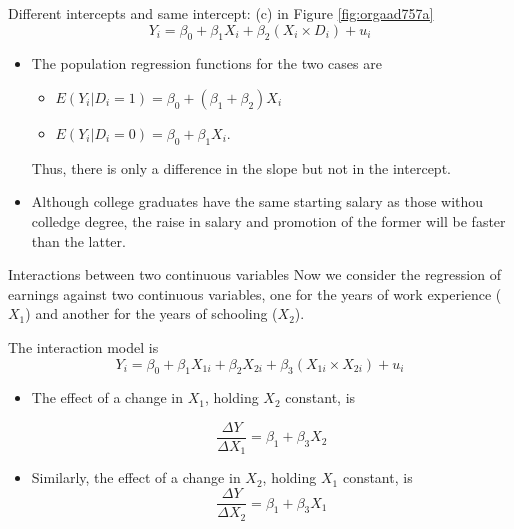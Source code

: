 \documentclass[presentation,10pt]{beamer}
\begin{document}
\begin{frame}[label={sec:org9cf1937}]{Different intercepts and same intercept: (c) in Figure \ref{fig:orgaad757a}}
\begin{equation}
\label{eq:interact-dx-c}
Y_i = \beta_0 + \beta_1 X_i + \beta_2 (X_i \times D_i) + u_i
\end{equation}

\begin{itemize}
\item The population regression functions for the two cases are
\begin{itemize}
\item \(E(Y_i|D_i=1) = \beta_0 + (\beta_1 + \beta_2) X_i\)
\item \(E(Y_i|D_i=0) = \beta_0 + \beta_1 X_i\).
\end{itemize}
Thus, there is only a difference in the slope but not in the
intercept.

\item Although college graduates have the same starting salary as those
withou colledge degree, the raise in salary and promotion of the
former will be faster than the latter.
\end{itemize}
\end{frame}

\begin{frame}[label={sec:orgf7dc2a2}]{Interactions between two continuous variables}
Now we consider the regression of earnings against two continuous
variables, one for the years of work experience (\(X_1\)) and another
for the years of schooling (\(X_2\)).

\vspace{0.2cm}
The interaction model is
\begin{equation}
\label{eq:interact-xx}
Y_i = \beta_0 + \beta_1 X_{1i} + \beta_2 X_{2i} + \beta_3 (X_{1i} \times X_{2i}) + u_i
\end{equation}
\begin{itemize}
\item The effect of a change in \(X_1\), holding \(X_2\) constant, is

\[ \frac{\Delta Y}{\Delta X_1} = \beta_1 + \beta_3 X_2 \]
\item Similarly, the effect of a change in \(X_2\), holding \(X_1\) constant, is
\[ \frac{\Delta Y}{\Delta X_2} = \beta_1 + \beta_3 X_1 \]
\end{itemize}
\end{frame}
\end{document}
